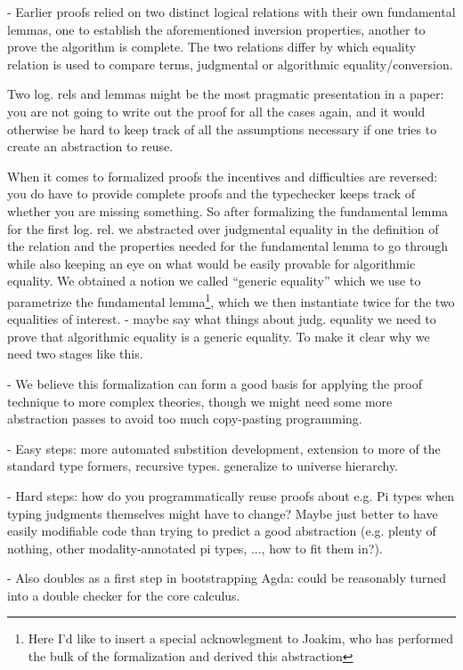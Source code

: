  - Earlier proofs relied on two distinct logical relations with their
 own fundamental lemmas, one to establish the aforementioned inversion
 properties, another to prove the algorithm is complete.
 The two relations differ by which equality relation is used to
 compare terms, judgmental or algorithmic equality/conversion.
 
 Two log. rels and lemmas might be the most pragmatic presentation in
 a paper: you are not going to write out the proof for all the cases
 again, and it would otherwise be hard to keep track of all the
 assumptions necessary if one tries to create an abstraction to reuse.

 When it comes to formalized proofs the incentives and difficulties
 are reversed: you do have to provide complete proofs and the
 typechecker keeps track of whether you are missing something. So
 after formalizing the fundamental lemma for the first log. rel. we
 abstracted over judgmental equality in the definition of the relation
 and the properties needed for the fundamental lemma to go through
 while also keeping an eye on what would be easily provable for
 algorithmic equality.  We obtained a notion we called ``generic
 equality'' which we use to parametrize the fundamental
 lemma\footnote{Here I'd like to insert a special acknowlegment to
   Joakim, who has performed the bulk of the formalization and derived
   this abstraction}, which we then instantiate twice for the two
 equalities of interest.
   - maybe say what things about judg. equality we need to prove that
   algorithmic equality is a generic equality. To make it clear why we need two stages like this.
   
 - We believe this formalization can form a good basis for applying
 the proof technique to more complex theories, though we might need
 some more abstraction passes to avoid too much copy-pasting programming.

 - Easy steps: more automated substition development, extension to
 more of the standard type formers, recursive types. generalize to universe hierarchy.

 - Hard steps: how do you programmatically reuse proofs about e.g. Pi
 types when typing judgments themselves might have to change? Maybe
 just better to have easily modifiable code than trying to predict a
 good abstraction (e.g. plenty of nothing, other modality-annotated pi types, ..., how to fit them in?).
 
 - Also doubles as a first step in bootstrapping Agda: could be
 reasonably turned into a double checker for the core calculus.

